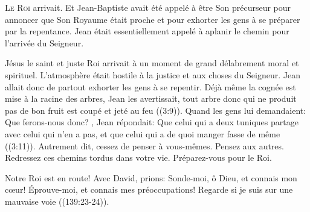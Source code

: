 



\lettrine{L}{e Roi} arrivait. Et Jean-Baptiste avait été appelé
 à être Son précurseur \ocadr pour annoncer que Son Royaume
 était proche et pour exhorter les gens à se préparer par la repentance.
 Jean était essentiellement appelé à aplanir le chemin
 pour l'arrivée du Seigneur.


Jésus \ocadr le saint et juste Roi \fcadr{} arrivait à un moment
 de grand délabrement moral et spirituel.
 L'atmosphère était hostile à la justice et aux choses du Seigneur.
 Jean allait donc de partout exhorter les gens à se repentir.
 \Og Déjà même la cognée est mise à la racine des arbres, Jean les avertissait,
 tout arbre donc qui ne produit pas de bon fruit est coupé et jeté au feu \Fg{}
 ((3:9)). 
 Quand les gens lui demandaient: 
 \Og Que ferons-nous donc? \Fg{}, Jean répondait: 
 \Og Que celui qui a deux tuniques partage avec celui qui n'en a pas,
 et que celui qui a de quoi manger fasse de même \Fg{} ((3:11)).
 Autrement dit, cessez de penser à vous-mêmes. Pensez aux autres.
 Redressez ces chemins tordus dans votre vie. Préparez-vous pour le Roi.

Notre Roi est en route! Avec David, prions: 
 \Og Sonde-moi, ô Dieu, et connais mon c\oe{}ur!
 Éprouve-moi, et connais mes préoccupations!
 Regarde si je suis sur une mauvaise voie \Fg{} ((139:23-24)).

\dvrule




